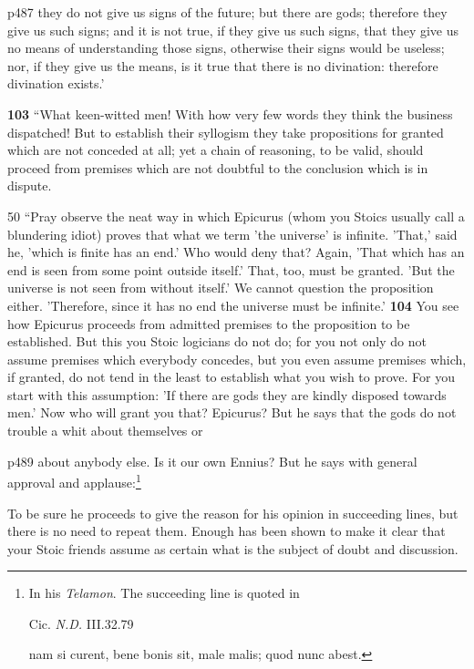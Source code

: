 p487 they do not give us signs of the future; but there are gods; therefore they give us such signs; and it is not true, if they give us such signs, that they give us no means of understanding those signs, otherwise their signs would be useless; nor, if they give us the means, is it true that there is no divination: therefore divination exists.'

\textbf{103} ``What keen-witted men! With how very few words they think the business dispatched! But to establish their syllogism they take propositions for granted which are not conceded at all; yet a chain of reasoning, to be valid, should proceed from premises which are not doubtful to the conclusion which is in dispute.

50
``Pray observe the neat way in which Epicurus (whom you Stoics usually call a blundering idiot) proves that what we term 'the universe' is infinite. 'That,' said he, 'which is finite has an end.' Who would deny that? Again, 'That which has an end is seen from some point outside itself.' That, too, must be granted. 'But the universe is not seen from without itself.' We cannot question the proposition either. 'Therefore, since it has no end the universe must be infinite.' \textbf{104} You see how Epicurus proceeds from admitted premises to the proposition to be established. But this you Stoic logicians do not do; for you not only do not assume premises which everybody concedes, but you even assume premises which, if granted, do not tend in the least to establish what you wish to prove. For you start with this assumption: 'If there are gods they are kindly disposed towards men.' Now who will grant you that? Epicurus? But he says that the gods do not trouble a whit about themselves or

p489 about anybody else. Is it our own Ennius? But he says with general approval and applause:\footnote{In his \emph{Telamon}. The succeeding line is quoted in

Cic. \emph{N.D.} III.32.79

nam si curent, bene bonis sit, male malis; quod nunc abest.

}

To be sure he proceeds to give the reason for his opinion in succeeding lines, but there is no need to repeat them. Enough has been shown to make it clear that your Stoic friends assume as certain what is the subject of doubt and discussion.

